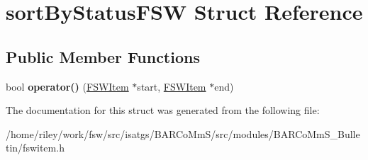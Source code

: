 \hypertarget{structsort_by_status_f_s_w}{}\section{sort\+By\+Status\+F\+SW Struct Reference}
\label{structsort_by_status_f_s_w}
\subsection*{Public Member Functions}
\begin{DoxyCompactItemize}
\item 
bool {\bfseries operator()} (\hyperlink{class_f_s_w_item}{F\+S\+W\+Item} $\ast$start, \hyperlink{class_f_s_w_item}{F\+S\+W\+Item} $\ast$end)\hypertarget{structsort_by_status_f_s_w_a57a6cfebace4e22c183fd24ec3cc75d7}{}\label{structsort_by_status_f_s_w_a57a6cfebace4e22c183fd24ec3cc75d7}

\end{DoxyCompactItemize}


The documentation for this struct was generated from the following file\+:\begin{DoxyCompactItemize}
\item 
/home/riley/work/fsw/src/isatgs/\+B\+A\+R\+Co\+Mm\+S/src/modules/\+B\+A\+R\+Co\+Mm\+S\+\_\+\+Bulletin/fswitem.\+h\end{DoxyCompactItemize}
